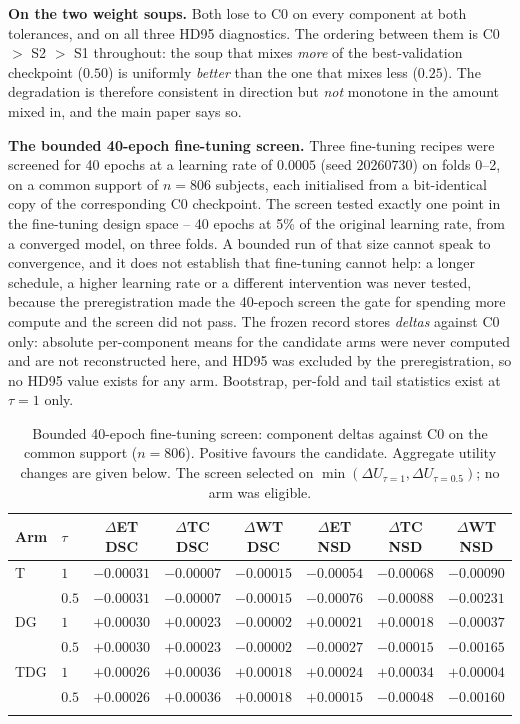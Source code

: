 \documentclass[runningheads]{llncs}
\begin{document}
\medskip\noindent\textbf{On the two weight soups.} Both lose to C0 on every component at both
tolerances, and on all three HD95 diagnostics. The ordering between them is C0 $>$ S2 $>$ S1
throughout: the soup that mixes \emph{more} of the best-validation checkpoint ($0.50$) is uniformly
\emph{better} than the one that mixes less ($0.25$). The degradation is therefore consistent in
direction but \emph{not} monotone in the amount mixed in, and the main paper says so.


\medskip\noindent\textbf{The bounded 40-epoch fine-tuning screen.} Three fine-tuning recipes were
screened for 40 epochs at a learning rate of $0.0005$ (seed $20260730$) on folds 0--2, on a
common support of $n=806$ subjects, each initialised from a bit-identical copy of the corresponding
C0 checkpoint. The screen tested exactly one point in the fine-tuning design space -- 40 epochs at 5\% of the original learning rate, from a converged model, on three folds. A bounded run of that size cannot speak to convergence, and it does not establish that fine-tuning cannot help: a longer schedule, a higher learning rate or a different intervention was never tested, because the preregistration made the 40-epoch screen the gate for spending more compute and the screen did not pass. The frozen record stores \emph{deltas} against C0 only: absolute
per-component means for the candidate arms were never computed and are not reconstructed here, and
HD95 was excluded by the preregistration, so no HD95 value exists for any arm. Bootstrap, per-fold
and tail statistics exist at $\tau=1$ only.

\begin{table}[!htbp]\centering\small
\caption{Bounded 40-epoch fine-tuning screen: component deltas against C0 on the common support ($n=806$). Positive favours the candidate. Aggregate utility changes are given below. The screen selected on $\min(\Delta U_{\tau=1},\Delta U_{\tau=0.5})$; no arm was eligible.}
\begin{tabular}{@{}llcccccc@{}}
\toprule
Arm & $\tau$ & $\Delta$ET DSC & $\Delta$TC DSC & $\Delta$WT DSC & $\Delta$ET NSD & $\Delta$TC NSD & $\Delta$WT NSD \\
\midrule
T & $1$ & $-0.00031$ & $-0.00007$ & $-0.00015$ & $-0.00054$ & $-0.00068$ & $-0.00090$ \\
 & $0.5$ & $-0.00031$ & $-0.00007$ & $-0.00015$ & $-0.00076$ & $-0.00088$ & $-0.00231$ \\
\addlinespace[2pt]
DG & $1$ & $+0.00030$ & $+0.00023$ & $-0.00002$ & $+0.00021$ & $+0.00018$ & $-0.00037$ \\
 & $0.5$ & $+0.00030$ & $+0.00023$ & $-0.00002$ & $-0.00027$ & $-0.00015$ & $-0.00165$ \\
\addlinespace[2pt]
TDG & $1$ & $+0.00026$ & $+0.00036$ & $+0.00018$ & $+0.00024$ & $+0.00034$ & $+0.00004$ \\
 & $0.5$ & $+0.00026$ & $+0.00036$ & $+0.00018$ & $+0.00015$ & $-0.00048$ & $-0.00160$ \\
\addlinespace[2pt]
\bottomrule
\end{tabular}
\end{table}
\end{document}
